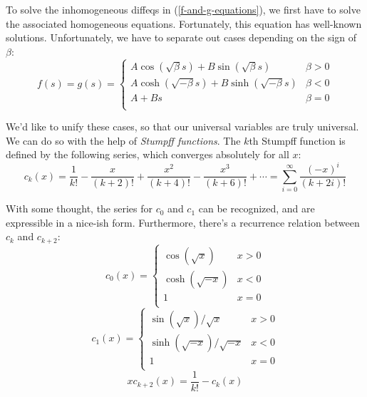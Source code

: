 \documentclass{article}
\numberwithin{equation}{subsection}
\begin{document}
To solve the inhomogeneous diffeqs in (\ref{f-and-g-equations}), we first have to solve the associated homogeneous equations. Fortunately, this equation has well-known solutions. Unfortunately, we have to separate out cases depending on the sign of $\beta$:
\begin{equation}
\label{homogeneous-solutions}
f(s) = g(s) = \begin{cases}
A \cos(\sqrt{\beta} s) + B \sin(\sqrt{\beta} s)     & \beta > 0 \\
A \cosh(\sqrt{-\beta} s) + B \sinh(\sqrt{-\beta} s) & \beta < 0 \\
A + B s                                  & \beta = 0 \\
\end{cases}
\end{equation}

We'd like to unify these cases, so that our universal variables are truly universal. We can do so with the help of \emph{Stumpff functions}. The $k$th Stumpff function is defined by the following series, which converges absolutely for all $x$:
\begin{equation}
c_k(x) = \frac{1}{k!} - \frac{x}{(k+2)!} + \frac{x^2}{(k+4)!} - \frac{x^3}{(k+6)!} + \cdots
= \sum_{i=0}^\infty \frac{(-x)^i}{(k+2i)!}
\end{equation}

With some thought, the series for $c_0$ and $c_1$ can be recognized, and are expressible in a nice-ish form. Furthermore, there's a recurrence relation between $c_k$ and $c_{k+2}$:
\begin{equation}
c_0(x) = \begin{cases}
\cos(\sqrt x)    & x > 0 \\
\cosh(\sqrt{-x}) & x < 0 \\
1                & x = 0 \\
\end{cases}
\end{equation}
\begin{equation}
c_1(x) = \begin{cases}
\sin(\sqrt x) / \sqrt x      & x > 0 \\
\sinh(\sqrt{-x}) / \sqrt{-x} & x < 0 \\
1                            & x = 0 \\
\end{cases}
\end{equation}
\begin{equation}
x c_{k+2}(x) = \frac{1}{k!} - c_k(x)
\end{equation}
\end{document}
